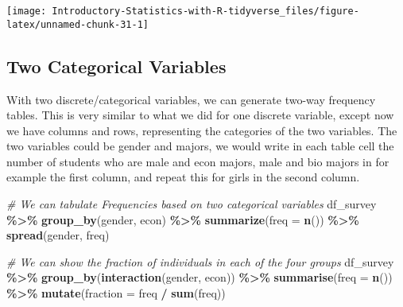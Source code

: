 \documentclass[
]{book}
\newenvironment{Shaded}{\begin{snugshade}}{\end{snugshade}}
\newcommand{\CommentTok}[1]{\textcolor[rgb]{0.56,0.35,0.01}{\textit{#1}}}
\newcommand{\DataTypeTok}[1]{\textcolor[rgb]{0.13,0.29,0.53}{#1}}
\newcommand{\KeywordTok}[1]{\textcolor[rgb]{0.13,0.29,0.53}{\textbf{#1}}}
\newcommand{\NormalTok}[1]{#1}
\newcommand{\OperatorTok}[1]{\textcolor[rgb]{0.81,0.36,0.00}{\textbf{#1}}}
\newcommand{\StringTok}[1]{\textcolor[rgb]{0.31,0.60,0.02}{#1}}
\begin{document}
\begin{center}\texttt{[image: Introductory-Statistics-with-R-tidyverse\_files/figure-latex/unnamed-chunk-31-1]} \end{center}

\hypertarget{two-categorical-variables}{%
\subsection{Two Categorical Variables}\label{two-categorical-variables}}

With two discrete/categorical variables, we can generate two-way frequency tables. This is very similar to what we did for one discrete variable, except now we have columns and rows, representing the categories of the two variables. The two variables could be gender and majors, we would write in each table cell the number of students who are male and econ majors, male and bio majors in for example the first column, and repeat this for girls in the second column.

\begin{Shaded}
\begin{Highlighting}[]
\CommentTok{\# We can tabulate Frequencies based on two categorical variables}
\NormalTok{df\_survey }\OperatorTok{\%\textgreater{}\%}
\StringTok{  }\KeywordTok{group\_by}\NormalTok{(gender, econ) }\OperatorTok{\%\textgreater{}\%}
\StringTok{  }\KeywordTok{summarize}\NormalTok{(}\DataTypeTok{freq =} \KeywordTok{n}\NormalTok{()) }\OperatorTok{\%\textgreater{}\%}
\StringTok{  }\KeywordTok{spread}\NormalTok{(gender, freq)}
\end{Highlighting}
\end{Shaded}

\begin{Shaded}
\begin{Highlighting}[]
\CommentTok{\# We can show the fraction of individuals in each of the four groups}
\NormalTok{df\_survey }\OperatorTok{\%\textgreater{}\%}
\StringTok{  }\KeywordTok{group\_by}\NormalTok{(}\KeywordTok{interaction}\NormalTok{(gender, econ)) }\OperatorTok{\%\textgreater{}\%}
\StringTok{  }\KeywordTok{summarise}\NormalTok{(}\DataTypeTok{freq =} \KeywordTok{n}\NormalTok{()) }\OperatorTok{\%\textgreater{}\%}
\StringTok{  }\KeywordTok{mutate}\NormalTok{(}\DataTypeTok{fraction =}\NormalTok{ freq }\OperatorTok{/}\StringTok{ }\KeywordTok{sum}\NormalTok{(freq))}
\end{Highlighting}
\end{Shaded}
\end{document}
